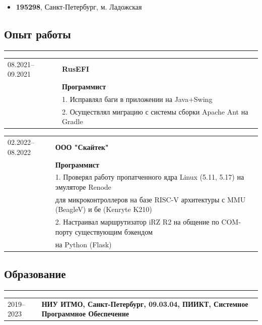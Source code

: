 \documentclass[10pt, final, twoside]{article}
\begin{document}
  \begin{itemize}
    \item \textbf{195298}, Санкт-Петербург, м. Ладожская
  \end{itemize}

  
  \subsection*{\textcolor{darkgray2}{Опыт работы}}
  \vspace*{-5.5mm}
  \par\noindent\rule{\textwidth}{0.1pt}
  \begin{table}[H]
    \begin{tabular}{ll}
      08.2021--09.2021 & \textbf{RusEFI}\\
                       & \textbf{Программист}\\
                       & 1. Исправлял баги в приложении на Java+Swing\\
                       & 2. Осуществлял миграцию с системы сборки Apache Ant на Gradle 
    \end{tabular}
  \end{table}
  \begin{table}[H]
    \begin{tabular}{ll}
      02.2022--08.2022 & \textbf{ООО "Скайтек"}\\
                       & \textbf{Программист}\\
                       & 1. Проверял работу пропатченного ядра Linux (5.11, 5.17) на эмуляторе   Renode\\
                       & для микроконтроллеров на базе RISC-V архитектуры с MMU (BeagleV) и бе   (Kenryte K210)\\
                       & 2. Настраивал маршрутизатор iRZ R2 на общение по COM-порту    существующим бэкендом\\
                       & на Python (Flask)
    \end{tabular}
  \end{table}

  \subsection*{\textcolor{darkgray2}{Образование}}
  \vspace*{-5.5mm}
  \par\noindent\rule{\textwidth}{0.1pt}
  \begin{table}[H]
    \begin{tabular}{ll}
      2019--2023 & \textbf{НИУ ИТМО, Санкт-Петербург, 09.03.04, ПИИКТ, Системное Программное Обеспечение}
    \end{tabular}
  \end{table}
\end{document}
